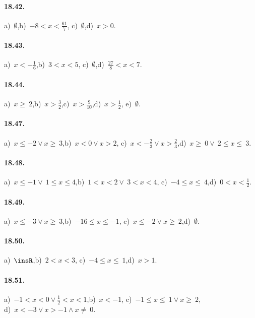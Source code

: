 \paragraph{18.42.} a)~$\emptyset$,\quad b)~$-8<x<\frac{61}{7}$,
\quad c)~$\emptyset$,\quad d)~$x>0$.

\paragraph{18.43.} a)~$x<-{\frac{1}{6}}$,\quad b)~$3<x<5$,
\quad c)~$\emptyset$,\quad d)~${\frac{27}{8}}<x<7$.

\paragraph{18.44.} a)~$x\ge~2$,\quad b)~$x>\frac{3}{2}$,\quad c)~$x>\frac{9}{10}$,\quad d)~$x>\frac{1}{2}$, \quad e)~$\emptyset$.

\paragraph{18.47.} a)~$x\le -2\vee x\ge~3$,\quad b)~$x<0\vee x>2$,\quad
c)~$x<-{\frac{2}{3}}\vee x>\frac{2}{3}$,\quad d)~$x\ge~0\vee~2\le x\le~3$.

\paragraph{18.48.} a)~$x\le -1\vee~1\le x\le4$,\quad b)~$1<x<2\vee~3<x<4$,\quad
c)~$-4\le x\le~4$,\quad d)~$0<x<\frac{1}{2}$.

\paragraph{18.49.} a)~$x\le -3\vee x\ge~3$,\quad b)~$-16\le x\le -1$,\quad
c)~$x\le -2\vee x\ge~2$,\quad d)~$\emptyset $.

\paragraph{18.50.} a)~$\insR$,\quad b)~$2<x<3$,\quad
c)~$-4\le x\le~1$,\quad d)~$x>1$.

\paragraph{18.51.} a)~$-1<x<0\vee \frac{1}{2}<x<1$,\quad b)~$x<-1$,\quad
c)~$-1\le x\le~1\vee x\ge~2$,\quad \protect\\ d)~$x<-3\vee x>-1\wedge x\neq~0$.

